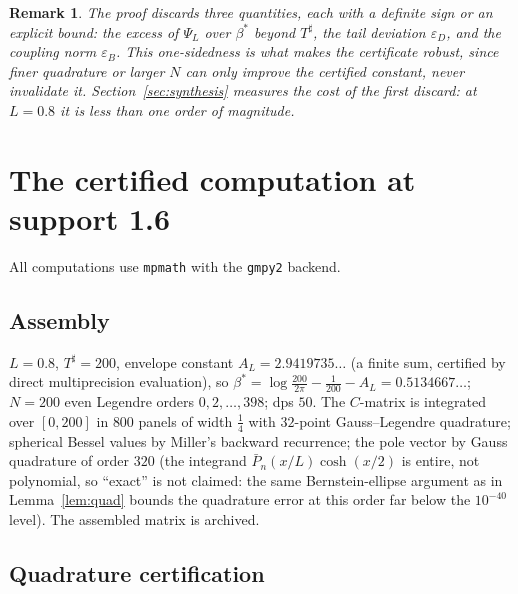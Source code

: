 ﻿\documentclass[11pt]{article}
\newtheorem{remark}[theorem]{Remark}
\newcommand{\Tsharp}{T^{\sharp}}
\begin{document}
\begin{remark}
The proof discards three quantities, each with a definite sign or an
explicit bound: the excess of $\Psi_L$ over $\beta^*$ beyond
$\Tsharp$, the tail deviation $\varepsilon_D$, and the coupling norm
$\varepsilon_B$.  This one-sidedness is what makes the certificate
robust, since finer quadrature or larger $N$ can only improve the
certified constant, never invalidate it.  Section~\ref{sec:synthesis}
measures the cost of the first discard: at $L=0.8$ it is less than one
order of magnitude.
\end{remark}

\section{The certified computation at support 1.6}
\label{sec:certified}

All computations use \texttt{mpmath} \cite{mpmath} with the
\texttt{gmpy2} backend.

\subsection{Assembly}
$L=0.8$, $\Tsharp=200$, envelope constant
$A_L=2.9419735\ldots$ (a finite sum, certified by direct
multiprecision evaluation), so
$\beta^*=\log\frac{200}{2\pi}-\frac1{200}-A_L=0.5134667\ldots$;
$N=200$ even Legendre orders $0,2,\dots,398$; dps $50$.  The
$C$-matrix is integrated over $[0,200]$ in $800$ panels of width
$\frac14$ with $32$-point Gauss--Legendre quadrature; spherical Bessel
values by Miller's backward recurrence; the pole vector by Gauss
quadrature of order $320$ (the integrand
$\bar P_n(x/L)\cosh(x/2)$ is entire, not polynomial, so ``exact'' is
not claimed: the same Bernstein-ellipse argument as in
Lemma~\ref{lem:quad} bounds the quadrature error at this order far
below the $10^{-40}$ level).
The assembled matrix is archived.

\subsection{Quadrature certification}
\end{document}
